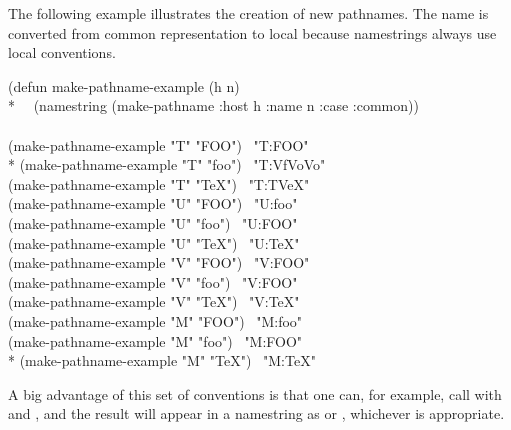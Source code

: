 \begin{newer}
\begin{lisp}
\end{lisp}
The following example illustrates the creation of new pathnames.
The name is converted from common representation to local because
namestrings always use local conventions.
\begin{lisp}
(defun make-pathname-example (h n) \\*
~~(namestring (make-pathname :host h :name n :case :common)) \\
\\
(make-pathname-example "T" "FOO") \EV\ "T:FOO" \\*
(make-pathname-example "T" "foo") \EV\ "T:{\Xcircumflex}Vf{\Xcircumflex}Vo{\Xcircumflex}Vo" \\
(make-pathname-example "T" "TeX") \EV\ "T:T{\Xcircumflex}VeX" \\
(make-pathname-example "U" "FOO") \EV\ "U:foo" \\
(make-pathname-example "U" "foo") \EV\ "U:FOO" \\
(make-pathname-example "U" "TeX") \EV\ "U:TeX" \\
(make-pathname-example "V" "FOO") \EV\ "V:FOO" \\
(make-pathname-example "V" "foo") \EV\ "V:FOO" \\
(make-pathname-example "V" "TeX") \EV\ "V:TeX" \\
(make-pathname-example "M" "FOO") \EV\ "M:foo" \\
(make-pathname-example "M" "foo") \EV\ "M:FOO" \\*
(make-pathname-example "M" "TeX") \EV\ "M:TeX"
\end{lisp}
A big advantage of this set of conventions is that one can, for example,
call  with  and ,
and the result will appear in a namestring as  or ,
whichever is appropriate.
\end{newer}

